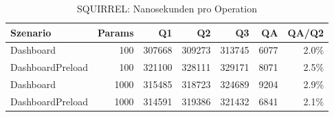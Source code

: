 \begin{table}[ht]
\centering
\caption{SQUIRREL: Nanosekunden pro Operation}
\begin{tabular}{lrrrrrr}
\toprule
Szenario & Params & Q1 & Q2 & Q3 & QA & QA/Q2 \\
\midrule
		Dashboard & 100 & 307668 & 309273 & 313745 & 6077 & 2.0\% \\
		DashboardPreload & 100 & 321100 & 328111 & 329171 & 8071 & 2.5\% \\
		Dashboard & 1000 & 315485 & 318723 & 324689 & 9204 & 2.9\% \\
		DashboardPreload & 1000 & 314591 & 319386 & 321432 & 6841 & 2.1\% \\
\bottomrule
\end{tabular}
\label{tab:benchmark_squirrel_nsperop}
\end{table}
	